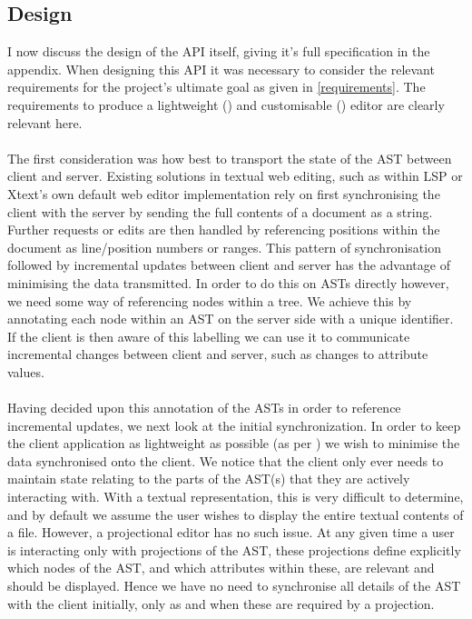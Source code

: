 \documentclass{article}
\begin{document}
\subsection{Design}\label{apiDesign}
I now discuss the design of the API itself, giving it's full specification in the appendix. When designing this API it was necessary to consider the relevant requirements for the project's ultimate goal as given in \ref{requirements}. The requirements to produce a lightweight (\RLightweight) and customisable (\RCustom) editor are clearly relevant here.
\\
\\
The first consideration was how best to transport the state of the AST between client and server. Existing solutions in textual web editing, such as within LSP or Xtext's own default web editor implementation rely on first synchronising the client with the server by sending the full contents of a document as a string. Further requests or edits are then handled by referencing positions within the document as line/position numbers or ranges. This pattern of synchronisation followed by incremental updates between client and server has the advantage of minimising the data transmitted. In order to do this on ASTs directly however, we need some way of referencing nodes within a tree. We achieve this by annotating each node within an AST on the server side with a unique identifier. If the client is then aware of this labelling we can use it to communicate incremental changes between client and server, such as changes to attribute values.
\\
\\
Having decided upon this annotation of the ASTs in order to reference incremental updates, we next look at the initial synchronization. In order to keep the client application as lightweight as possible (as per \RLightweight) we wish to minimise the data synchronised onto the client. We notice that the client only ever needs to maintain state relating to the parts of the AST(s) that they are actively interacting with. With a textual representation, this is very difficult to determine, and by default we assume the user wishes to display the entire textual contents of a file. However, a projectional editor has no such issue. At any given time a user is interacting only with projections of the AST, these projections define explicitly which nodes of the AST, and which attributes within these, are relevant and should be displayed. Hence we have no need to synchronise all details of the AST with the client initially, only as and when these are required by a projection.
\end{document}
